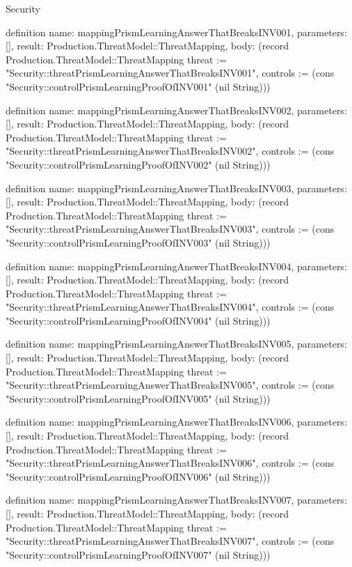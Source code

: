 \begin{lexlean}{Security}
\begin{semanticmodule}
definition{
  name: mappingPrismLearningAnswerThatBreaksINV001,
  parameters: [],
  result: Production.ThreatModel::ThreatMapping,
  body: (record Production.ThreatModel::ThreatMapping {threat := "Security::threatPrismLearningAnswerThatBreaksINV001", controls := (cons "Security::controlPrismLearningProofOfINV001" (nil String))})
}

definition{
  name: mappingPrismLearningAnswerThatBreaksINV002,
  parameters: [],
  result: Production.ThreatModel::ThreatMapping,
  body: (record Production.ThreatModel::ThreatMapping {threat := "Security::threatPrismLearningAnswerThatBreaksINV002", controls := (cons "Security::controlPrismLearningProofOfINV002" (nil String))})
}

definition{
  name: mappingPrismLearningAnswerThatBreaksINV003,
  parameters: [],
  result: Production.ThreatModel::ThreatMapping,
  body: (record Production.ThreatModel::ThreatMapping {threat := "Security::threatPrismLearningAnswerThatBreaksINV003", controls := (cons "Security::controlPrismLearningProofOfINV003" (nil String))})
}

definition{
  name: mappingPrismLearningAnswerThatBreaksINV004,
  parameters: [],
  result: Production.ThreatModel::ThreatMapping,
  body: (record Production.ThreatModel::ThreatMapping {threat := "Security::threatPrismLearningAnswerThatBreaksINV004", controls := (cons "Security::controlPrismLearningProofOfINV004" (nil String))})
}

definition{
  name: mappingPrismLearningAnswerThatBreaksINV005,
  parameters: [],
  result: Production.ThreatModel::ThreatMapping,
  body: (record Production.ThreatModel::ThreatMapping {threat := "Security::threatPrismLearningAnswerThatBreaksINV005", controls := (cons "Security::controlPrismLearningProofOfINV005" (nil String))})
}

definition{
  name: mappingPrismLearningAnswerThatBreaksINV006,
  parameters: [],
  result: Production.ThreatModel::ThreatMapping,
  body: (record Production.ThreatModel::ThreatMapping {threat := "Security::threatPrismLearningAnswerThatBreaksINV006", controls := (cons "Security::controlPrismLearningProofOfINV006" (nil String))})
}

definition{
  name: mappingPrismLearningAnswerThatBreaksINV007,
  parameters: [],
  result: Production.ThreatModel::ThreatMapping,
  body: (record Production.ThreatModel::ThreatMapping {threat := "Security::threatPrismLearningAnswerThatBreaksINV007", controls := (cons "Security::controlPrismLearningProofOfINV007" (nil String))})
}


\end{semanticmodule}
\end{lexlean}
